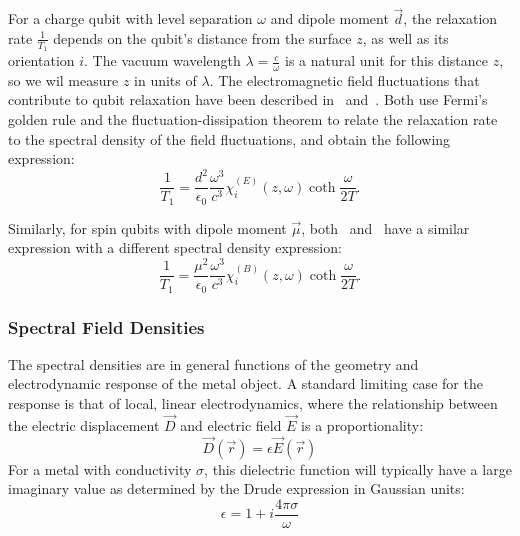 \documentclass[%
 preprint,
 amsmath,amssymb,
 aps,
]{revtex4-2}
\begin{document}
For a charge qubit with level separation $\omega$ and dipole moment $\vec{d}$, the relaxation rate $\frac{1}{T_1}$ depends on the qubit's distance from the surface $z$, as well as its orientation $i$.
The vacuum wavelength $\lambda = \frac{c}{\omega}$ is a natural unit for this distance $z$, so we wil measure $z$ in units of $\lambda$.
The electromagnetic field fluctuations that contribute to qubit relaxation have been described in~\cite{QubitRelax} and~\cite{Henkel1999}.
Both use Fermi's golden rule and the fluctuation-dissipation theorem to relate the relaxation rate to the spectral density of the field fluctuations, and obtain the following expression:
\begin{equation}
	\frac{1}{T_1} = \frac{d^2}{\epsilon_0} \frac{\omega^3}{c^3} \chi_{i}^{(E)}(z, \omega) \coth\frac{\omega}{2 T}.
\end{equation}

Similarly, for spin qubits with dipole moment $\vec{\mu}$, both~\cite{QubitRelax} and~\cite{Henkel1999} have a similar expression with a different spectral density expression:
\begin{equation}
	\frac{1}{T_1} = \frac{\mu^2}{\epsilon_0} \frac{\omega^3}{c^3} \chi_{i}^{(B)}(z, \omega) \coth\frac{\omega}{2 T}.
\end{equation}

\subsubsection{Spectral Field Densities} \label{subsec:spectraldensities}
The spectral densities are in general functions of the geometry and electrodynamic response of the metal object.
A standard limiting case for the response is that of local, linear electrodynamics, where the relationship between the electric displacement $\vec{D}$ and electric field $\vec{E}$ is a proportionality:
\begin{equation}
	\vec{D}(\vec{r}) = \epsilon \vec{E}(\vec{r})
\end{equation}
For a metal with conductivity $\sigma$, this dielectric function will typically have a large imaginary value as determined by the Drude expression in Gaussian units:
\begin{equation}
	\epsilon = 1 + i\frac{4 \pi \sigma}{\omega}
\end{equation}
\end{document}
